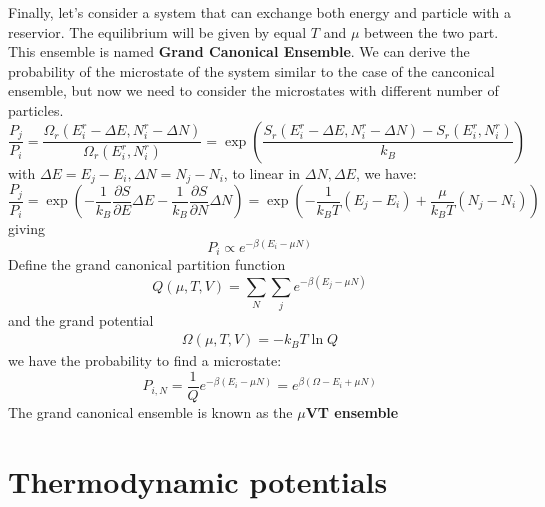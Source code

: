 \documentclass{article}
\begin{document}
Finally, let's consider a system that can exchange both energy and particle with 
a reservior. The equilibrium will be given by equal $T$ and $\mu$ between the 
two part. This ensemble is named \textbf{Grand Canonical Ensemble}.
We can derive the probability of the microstate of the system similar to the 
case of the canconical ensemble, but now we need to consider the microstates with 
different number of particles. 
\begin{equation}
    \frac{P_j}{P_i} = \frac{\Omega_r(E^r_i - \Delta E, N^r_i - \Delta N)}{\Omega_r(E^r_i,N^r_i)} = \exp\left( \frac{S_r(E^r_i - \Delta E, N^r_i - \Delta N)-S_r(E^r_i,N^r_i)}{k_B} \right)
\end{equation}
with $\Delta E = E_j - E_i, \Delta N = N_j - N_i$, to linear in $\Delta N, \Delta E$, we have:
\begin{equation}
    \frac{P_j}{P_i} = \exp\left( -\frac{1}{k_B} \frac{\partial S}{\partial E} \Delta E - \frac{1}{k_B} \frac{\partial S}{\partial N} \Delta N \right)
    = \exp\left( -\frac{1}{k_BT} (E_j - E_i) + \frac{\mu}{k_BT} (N_j - N_i) \right)
\end{equation}
giving
\begin{equation}
    P_i \propto e^{-\beta (E_i - \mu N)}
\end{equation}
Define the grand canonical partition function 
\begin{equation}
    Q(\mu,T,V) = \sum_N\sum_j e^{-\beta (E_j - \mu N)}
\end{equation}
and the grand potential 
\begin{eqnarray}
    \Omega(\mu,T,V) = -k_BT\ln Q
\end{eqnarray}
we have the probability to find a microstate:
\begin{equation}
    P_{i,N} = \frac{1}{Q} e^{-\beta (E_i - \mu N)} = e^{\beta(\Omega - E_i + \mu N)}
\end{equation}
The grand canonical ensemble is known as the \textbf{$\mu$VT ensemble}

\pagebreak
\section{Thermodynamic potentials}
\end{document}
